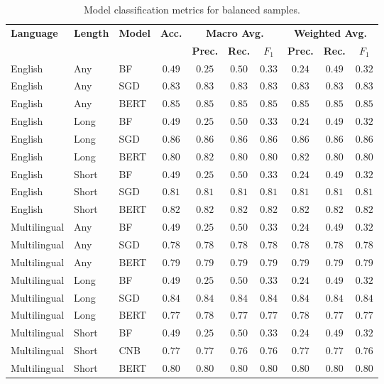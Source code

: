 \begin{table}[ht]
    \centering
    \begin{tabular}{l l l | c | c c c | c c c}
        \toprule
        \multirow{2}{*}{\textbf{Language}}&\multirow{2}{*}{\textbf{Length}}&\multirow{2}{*}{\textbf{Model}}&\multirow{2}{*}{\textbf{Acc.}}&\multicolumn{3}{c}{\textbf{Macro Avg.}}&\multicolumn{3}{|c}{\textbf{Weighted Avg.}}\\
        &&&&\textbf{Prec.} & \textbf{Rec.} & \textbf{$F_1$} & \textbf{Prec.} & \textbf{Rec.} & \textbf{$F_1$}\\\midrule
        English&Any&BF&$0.49$&$0.25$&$0.50$&$0.33$&$0.24$&$0.49$&$0.32$\\
        English&Any&SGD&$0.83$&$0.83$&$0.83$&$0.83$&$0.83$&$0.83$&$0.83$\\
        English&Any&BERT&$\mathbf{0.85}$&$0.85$&$0.85$&$\mathbf{0.85}$&$0.85$&$0.85$&$\mathbf{0.85}$\\\midrule
        English&Long&BF&$0.49$&$0.25$&$0.50$&$0.33$&$0.24$&$0.49$&$0.32$\\
        English&Long&SGD&$\mathbf{0.86}$&$0.86$&$0.86$&$\mathbf{0.86}$&$0.86$&$0.86$&$\mathbf{0.86}$\\
        English&Long&BERT&$0.80$&$0.82$&$0.80$&$0.80$&$0.82$&$0.80$&$0.80$\\\midrule
        English&Short&BF&$0.49$&$0.25$&$0.50$&$0.33$&$0.24$&$0.49$&$0.32$\\
        English&Short&SGD&$0.81$&$0.81$&$0.81$&$0.81$&$0.81$&$0.81$&$0.81$\\
        English&Short&BERT&$\mathbf{0.82}$&$0.82$&$0.82$&$\mathbf{0.82}$&$0.82$&$0.82$&$\mathbf{0.82}$\\\midrule
        Multilingual&Any&BF&$0.49$&$0.25$&$0.50$&$0.33$&$0.24$&$0.49$&$0.32$\\
        Multilingual&Any&SGD&$0.78$&$0.78$&$0.78$&$0.78$&$0.78$&$0.78$&$0.78$\\
        Multilingual&Any&BERT&$\mathbf{0.79}$&$0.79$&$0.79$&$\mathbf{0.79}$&$0.79$&$0.79$&$\mathbf{0.79}$\\\midrule
        Multilingual&Long&BF&$0.49$&$0.25$&$0.50$&$0.33$&$0.24$&$0.49$&$0.32$\\
        Multilingual&Long&SGD&$\mathbf{0.84}$&$0.84$&$0.84$&$\mathbf{0.84}$&$0.84$&$0.84$&$\mathbf{0.84}$\\
        Multilingual&Long&BERT&$0.77$&$0.78$&$0.77$&$0.77$&$0.78$&$0.77$&$0.77$\\\midrule
        Multilingual&Short&BF&$0.49$&$0.25$&$0.50$&$0.33$&$0.24$&$0.49$&$0.32$\\
        Multilingual&Short&CNB&$0.77$&$0.77$&$0.76$&$0.76$&$0.77$&$0.77$&$0.76$\\
        Multilingual&Short&BERT&$\mathbf{0.80}$&$0.80$&$0.80$&$\mathbf{0.80}$&$0.80$&$0.80$&$\mathbf{0.80}$\\
        \bottomrule
    \end{tabular}
    \caption{Model classification metrics for balanced samples.}
    \label{tab:Res_RF_Pol_MetricBal}
\end{table}

